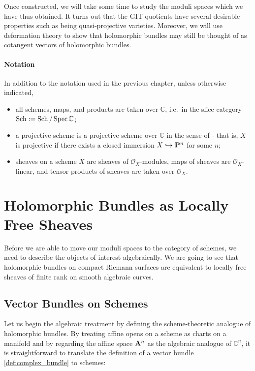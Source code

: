 \documentclass[12pt]{ociamthesis}  %
\begin{document}
Once constructed, we will take some time to study the moduli
spaces which we have thus obtained. It turns out that the GIT
quotients have several desirable properties such as being
quasi-projective varieties. Moreover, we will use deformation 
theory to show that holomorphic bundles may still be thought
of as cotangent vectors of holomorphic bundles.

\paragraph*{Notation} In addition to the notation used in the previous chapter, unless
otherwise indicated,
\begin{itemize}
  \item all schemes, maps, and products are taken over $\mathbb{C}$,
        i.e.~in the slice category $\operatorname{Sch} := \operatorname{Sch}/\operatorname{Spec}\mathbb{C}$;
  \item a projective scheme is a projective scheme over $\mathbb{C}$
        in the sense of \cite{hartshorne1977} - that is, $X$ is projective
        if there exists a closed immersion $X\hookrightarrow\mathbf{P}^{n}_{}$ for
        some $n$;
  \item sheaves on a scheme $X$ are sheaves of $\mathscr O_X$-modules,
        maps of sheaves are $\mathscr O_X$-linear, and tensor products
        of sheaves are taken over $\mathscr O_X$.
\end{itemize}

\section{Holomorphic Bundles as Locally Free Sheaves}

Before we are able to move our moduli spaces to the category of
schemes, we need to describe the objects of interest algebraically.
We are going to see that holomorphic bundles on
compact Riemann surfaces are equivalent to locally free sheaves
of finite rank on smooth algebraic curves.

\subsection{Vector Bundles on Schemes}

Let us begin the algebraic treatment by defining the scheme-theoretic
analogue of holomorphic bundles. By treating affine opens on a scheme as charts on a manifold
and by regarding the affine space $\mathbf{A}^{n}_{}$ as the algebraic
analogue of $\mathbb C^n$, it is straightforward to translate
the definition of a vector bundle \ref{def:complex_bundle} to schemes:
\end{document}
